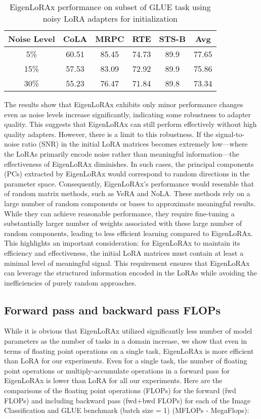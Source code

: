 \begin{table}[!h]
    \centering
        \caption{EigenLoRAx performance on subset of GLUE task using noisy LoRA adapters for initialization}
    \begin{tabular}{cccccc}
    \toprule
        Noise Level & CoLA & MRPC & RTE & STS-B & Avg \\ 
        \midrule
        5\% & 60.51 & 85.45 & 74.73 & 89.9 & 77.65 \\ 
        15\% & 57.53 & 83.09 & 72.92 & 89.9 & 75.86 \\ 
        30\% & 55.23 & 76.47 & 71.84 & 89.8 & 73.34 \\ 
        \bottomrule
    \end{tabular}
    \label{tab:noise}
\end{table}
The results show that EigenLoRAx exhibits only minor performance changes even as noise levels increase significantly, indicating some robustness to adapter quality. This suggests that EigenLoRAx can still perform effectively without high quality adapters. However, there is a limit to this robustness. If the signal-to-noise ratio (SNR) in the initial LoRA matrices becomes extremely low—where the LoRAs primarily encode noise rather than meaningful information—the effectiveness of EigenLoRAx diminishes.
In such cases, the principal components (PCs) extracted by EigenLoRAx would correspond to random directions in the parameter space. Consequently, EigenLoRAx’s performance would resemble that of random matrix methods, such as VeRA and NoLA. These methods rely on a large number of random components or bases to approximate meaningful results. While they can achieve reasonable performance, they require fine-tuning a substantially larger number of weights associated with these large number of random components, leading to less efficient learning compared to EigenLoRAx.
This highlights an important consideration: for EigenLoRAx to maintain its efficiency and effectiveness, the initial LoRA matrices must contain at least a minimal level of meaningful signal. This requirement ensures that EigenLoRAx can leverage the structured information encoded in the LoRAs while avoiding the inefficiencies of purely random approaches.

\subsection{Forward pass and backward pass FLOPs}

While it is obvious that EigenLoRAx utilized significantly less number of model parameters as the number of tasks in a domain increase, we show that even in terms of floating point operations on a single task, EigenLoRAx is more efficient than LoRA for our experiments. Even for a single task, the number of floating point operations or multiply-accumulate operations in a forward pass for EigenLoRAx is lower than LoRA for all our experiments. Here are the comparisons of the floating point operations (FLOPs) for the forward (fwd FLOPs) and including backward pass (fwd+bwd FLOPs) for each of the Image Classification and GLUE benchmark (batch size = 1) (MFLOPs - MegaFlops):

